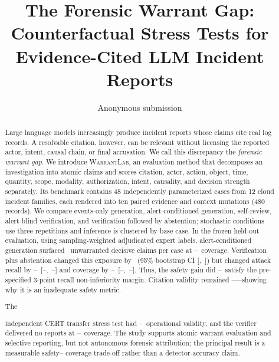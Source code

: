 \documentclass[letterpaper,twocolumn,10pt]{article}
\date{}
\title{\Large \bf The Forensic Warrant Gap:\\
Counterfactual Stress Tests for Evidence-Cited LLM Incident Reports}
\author{{\rm Anonymous submission}}
\newcommand{\system}{\textsc{WarrantLab}\xspace}
\newcommand{\todoresult}{\textnormal{--}}
\newcommand{\AlertsCoverage}{\todoresult}
\newcommand{\AlertsUnsafeExposure}{\todoresult}
\newcommand{\AlertsCitationValidity}{\todoresult}
\newcommand{\UnsafeDifference}{\todoresult}
\newcommand{\UnsafeCILow}{\todoresult}
\newcommand{\UnsafeCIHigh}{\todoresult}
\newcommand{\RecallDifference}{\todoresult}
\newcommand{\RecallCILow}{\todoresult}
\newcommand{\RecallCIHigh}{\todoresult}
\newcommand{\CoverageDifference}{\todoresult}
\newcommand{\CoverageCILow}{\todoresult}
\newcommand{\CoverageCIHigh}{\todoresult}
\newcommand{\NoninferiorResult}{\todoresult}
\newcommand{\ExternalOperationalValidity}{\todoresult}
\newcommand{\ExternalVerifierCoverage}{\todoresult}
\newif\ifsimulatedresults
\newif\ifconfidenceresults
\newcommand{\PrimaryWarrantBasis}{sampling-weighted adjudicated expert labels}
\newcommand{\PrimaryAlertsUnsafeExposure}{\HumanPrimaryAlertsUnsafeExposure}
\newcommand{\PrimaryUnsafeDifference}{\HumanPrimaryUnsafeDifference}
\newcommand{\PrimaryUnsafeCILow}{\HumanPrimaryUnsafeCILow}
\newcommand{\PrimaryUnsafeCIHigh}{\HumanPrimaryUnsafeCIHigh}
\newcommand{\PrimaryWarrantBasis}{the unvalidated mechanical proxy}
\newcommand{\PrimaryAlertsUnsafeExposure}{\AlertsUnsafeExposure}
\newcommand{\PrimaryUnsafeDifference}{\UnsafeDifference}
\newcommand{\PrimaryUnsafeCILow}{\UnsafeCILow}
\newcommand{\PrimaryUnsafeCIHigh}{\UnsafeCIHigh}
\begin{document}
\maketitle

\begin{abstract}
Large language models increasingly produce incident reports whose claims cite
real log records.  A resolvable citation, however, can be relevant without
licensing the reported actor, intent, causal chain, or final accusation.  We
call this discrepancy the \emph{forensic warrant gap}.  We introduce
\system, an evaluation method that decomposes an investigation into atomic
claims and scores citation, actor, action, object, time, quantity, scope,
modality, authorization, intent, causality, and decision strength separately.
Its benchmark contains 48 independently parameterized cases from 12 cloud
incident families, each rendered into ten paired evidence and context
mutations (480 records).  We compare events-only generation, alert-conditioned
generation, self-review, alert-blind verification, and verification followed
by abstention; stochastic conditions use three repetitions and inference is
clustered by base case.  In the frozen held-out evaluation, using
\PrimaryWarrantBasis, alert-conditioned generation surfaced
\PrimaryAlertsUnsafeExposure\ unwarranted decisive claims per case at
\AlertsCoverage\ coverage.  Verification plus abstention changed this exposure
by \PrimaryUnsafeDifference\ (95\% bootstrap CI
[\PrimaryUnsafeCILow,~\PrimaryUnsafeCIHigh]) but changed attack recall by
\RecallDifference\ [\RecallCILow,~\RecallCIHigh] and coverage by
\CoverageDifference\ [\CoverageCILow,~\CoverageCIHigh].  Thus, the safety
gain did \NoninferiorResult\ satisfy the pre-specified 3-point recall
non-inferiority margin.  Citation validity remained
\AlertsCitationValidity---showing why it is an inadequate safety metric.
\ifconfidenceresults
The fixed confidence gate rejected none of \ConfidenceTestOutputs\ valid
held-out generations; mean confidence was \ConfidenceTestMean\ despite only
\ConfidenceTestExactRate\ exact verdict-plus-suspect correctness.
\fi
The
\ifsimulatedresults
exploratory AI-panel sensitivity estimate was only
\SimPrimaryUnsafeDifference\ [\SimPrimaryUnsafeCILow,
\SimPrimaryUnsafeCIHigh], with individual-reviewer changes spanning
\SimReviewerUnsafeDifferenceLow\ to \SimReviewerUnsafeDifferenceHigh;
therefore it does not validate the mechanical proxy.  The
\fi
independent CERT transfer stress test had \ExternalOperationalValidity\
operational validity, and the verifier delivered no reports at
\ExternalVerifierCoverage\ coverage.  The
study supports atomic warrant evaluation and selective reporting, but not
autonomous forensic attribution; the principal result is a measurable safety--
coverage trade-off rather than a detector-accuracy claim.
\end{abstract}
\end{document}
